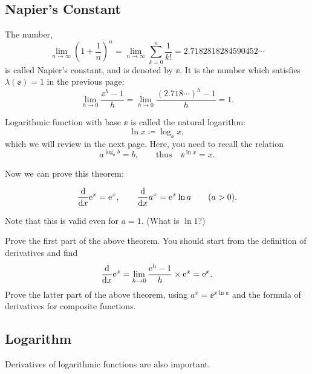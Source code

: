 \documentclass[11pt,pdfa,lastpage]{MishoNote}
\newcommand\starskip{\bigskip\begin{center}\pgfornament[width=7cm]{88}\end{center}\medskip}
\begin{document}
\newpage
\subsection{Napier's Constant}
The number,
\begin{equation}
  \lim_{n\to\infty}\left(1+\frac{1}n\right)^n=\lim_{n\to\infty}\sum_{k=0}^n\frac{1}{k!}=2.7182818284590452\cdots\label{eq:napier}
\end{equation}
is called Napier's constant, and is denoted by $\ee$. It is the number which satisfies $\lambda(\ee)=1$ in the previous page:
\begin{equation}
  \lim_{h\to 0}\frac{\ee^h-1}{h}= \lim_{h\to 0}\frac{(2.718\cdots)^h-1}{h}=1.
\end{equation}

Logarithmic function with base $\ee$ is called the natural logarithm:
\[
  \ln x \coloneq \log_{\ee} x,
\]
which we will review in the next page. Here, you need to recall  the relation
\[
  a^{\log_a b}= b,\qquad\text{thus}\quad \ee^{\ln x}=x.
\]

Now we can prove this theorem:

\begin{theorem}{}{}
  \begin{equation}
      \diff{}x{\ee^x}=\ee^x,\qquad
      \diff{}x{a^x}=\ee^x\ln a\qquad(a>0).
  \end{equation}
\end{theorem}
Note that this is valid even for $a=1$. (What is $\ln 1$?)

\starskip


\begin{enumerate}[resume]
  \itemA Prove the first part of the above theorem. You should start from the definition of derivatives and find
  \begin{equation}
    \diff{}x{\ee^x}=\lim_{h\to 0}\frac{\ee^h-1}{h}\times\ee^x=\ee^x.
  \end{equation}
  \itemA Prove the latter part of the above theorem, using $a^x=\ee^{x\ln a}$ and the formula of derivatives for composite functions.
\end{enumerate}

\newpage
\subsection{Logarithm}
Derivatives of logarithmic functions are also important.
\end{document}
